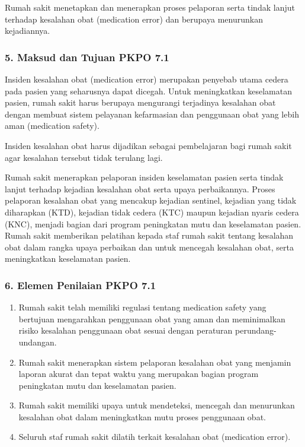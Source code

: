 \documentclass[
]{book}
\providecommand{\tightlist}{%
  \setlength{\itemsep}{0pt}\setlength{\parskip}{0pt}}
\begin{document}
Rumah sakit menetapkan dan menerapkan proses pelaporan serta tindak lanjut terhadap kesalahan obat (medication error) dan berupaya menurunkan kejadiannya.

\hypertarget{maksud-dan-tujuan-pkpo-7.1}{%
\subsubsection*{5. Maksud dan Tujuan PKPO 7.1}\label{maksud-dan-tujuan-pkpo-7.1}}

Insiden kesalahan obat (medication error) merupakan penyebab utama cedera pada pasien yang seharusnya dapat dicegah. Untuk meningkatkan keselamatan pasien, rumah sakit harus berupaya mengurangi terjadinya kesalahan obat dengan membuat sistem pelayanan kefarmasian dan penggunaan obat yang lebih aman (medication safety).

Insiden kesalahan obat harus dijadikan sebagai pembelajaran bagi rumah sakit agar kesalahan tersebut tidak terulang lagi.

Rumah sakit menerapkan pelaporan insiden keselamatan pasien serta tindak lanjut terhadap kejadian kesalahan obat serta upaya perbaikannya. Proses pelaporan kesalahan obat yang mencakup kejadian sentinel, kejadian yang tidak diharapkan (KTD), kejadian tidak cedera (KTC) maupun kejadian nyaris cedera (KNC), menjadi bagian dari program peningkatan mutu dan keselamatan pasien. Rumah sakit memberikan pelatihan kepada staf rumah sakit tentang kesalahan obat dalam rangka upaya perbaikan dan untuk mencegah kesalahan obat, serta meningkatkan keselamatan pasien.

\hypertarget{elemen-penilaian-pkpo-7.1}{%
\subsubsection*{6. Elemen Penilaian PKPO 7.1}\label{elemen-penilaian-pkpo-7.1}}

\begin{enumerate}
\def\labelenumi{\alph{enumi}.}
\tightlist
\item
  Rumah sakit telah memiliki regulasi tentang medication safety yang bertujuan mengarahkan penggunaan obat yang aman dan meminimalkan risiko kesalahan penggunaan obat sesuai dengan peraturan perundang- undangan.
\item
  Rumah sakit menerapkan sistem pelaporan kesalahan obat yang menjamin laporan akurat dan tepat waktu yang merupakan bagian program peningkatan mutu dan keselamatan pasien.
\item
  Rumah sakit memiliki upaya untuk mendeteksi, mencegah dan menurunkan kesalahan obat dalam meningkatkan mutu proses penggunaan obat.
\item
  Seluruh staf rumah sakit dilatih terkait kesalahan obat (medication error).
\end{enumerate}
\end{document}
